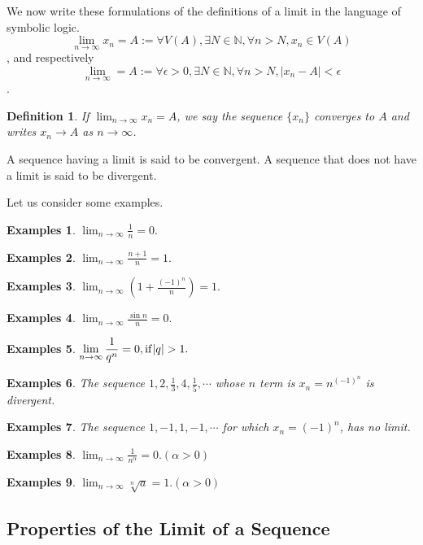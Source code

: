 \documentclass[a4paper,12pt]{article} %
\newtheorem{definition}{Definition}[section]
\newtheorem{example}{Examples}
\begin{document}
We now write these formulations of the definitions of a limit in the 
language of symbolic logic.
\[\lim_{n \to \infty} x_n = A := \forall V(A), \exists N \in \mathbb{N}, \forall n>N, x_n \in V(A)\],
and respectively
\[\lim_{n \to \infty } = A := \forall \epsilon >0, \exists N\in \mathbb{N}, \forall n>N, |x_n - A|<\epsilon\].
\begin{definition}
    \emph{
    If $\displaystyle \lim_{n \to \infty} x_n = A$, we say the sequence $\{x_n\}$ 
    converges to $A$ and writes $x_n \to A$ as $n \to \infty$.
    }
\end{definition}

A sequence having a limit is said to be convergent. A sequence that does not 
have a limit is said to be divergent.

Let us consider some examples.
\begin{example}
    $\displaystyle \lim_{n \to \infty} \frac{1}{n} = 0.$
\end{example}
\begin{example}
    $\displaystyle \lim_{n \to \infty} \frac{n+1}{n} = 1.$
\end{example}
\begin{example}
    $\displaystyle \lim_{n \to \infty} \left( 1+\frac{(-1)^n}{n}\right) = 1.$
\end{example}
\begin{example}
    $\displaystyle \lim_{n \to \infty} \frac{\sin n}{n} = 0.$
\end{example}
\begin{example}
    $\displaystyle \lim_{n \to \infty} \frac{1}{q^n} = 0, {\rm if } |q|>1.$
\end{example}
\begin{example}
    \emph{
    The sequence $1, 2, \frac{1}{3}, 4, \frac{1}{5}, \cdots$ whose $n$
    term is $\displaystyle x_n = n^{(-1)^n}$ is divergent. 
    }
\end{example}
\begin{example}
    \emph{
    The sequence $1, -1, 1, -1, \cdots$ for which $x_n = (-1)^n$, has no limit.
    }
\end{example}
\begin{example}
    $\displaystyle \lim_{n \to \infty} \frac{1}{n^{\alpha}} = 0. (\alpha>0)$
\end{example}
\begin{example}
    $\displaystyle \lim_{n \to \infty}\sqrt[n]{a}  = 1. (\alpha>0)$
\end{example}

\subsection{Properties of the Limit of a Sequence}
\end{document}
